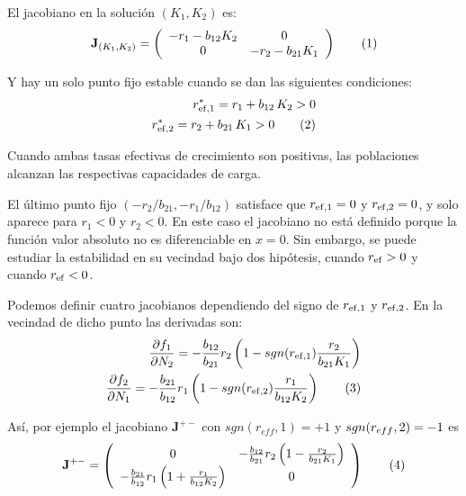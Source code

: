 El jacobiano en la solución $(K_1,K_2)$ es: 
\begin{equation}
\mathbf{J}_{\left(K_1,K_2\right)}= \left(
  \begin{array}{cc}
    -r_1-b_{12}K_2 & 0\\
    0 & -r_2-b_{21}K_1
    \end{array} \right)
\stepcounter{equation}\tag{\theequation}\label{eq:JacobK1K2}
\end{equation}

Y hay un solo punto fijo estable cuando se dan las siguientes condiciones:
\begin{align*}
\displaystyle r^{\ast}_{\rm{ef},1} = r_{1} + b_{12}\, K_2 > 0 \\
\displaystyle r^{\ast}_{\rm{ef},2} = r_{2} + b_{21}\, K_1 > 0
\stepcounter{equation}\tag{\theequation}\label{eq:conditio2}
\end{align*}

Cuando ambas tasas efectivas de crecimiento son positivas, las poblaciones alcanzan las respectivas capacidades de carga.

El último punto fijo $({-r_{2}}/{b_{21}}, {-r_{1}}/{b_{12}})$ satisface que $r_{\rm{ef},1}=0$ y $r_{\rm{ef},2}=0$, y solo aparece para $r_{1}<0$ y $r_{2}<0$. En este caso el jacobiano no está definido porque la función valor absoluto no es diferenciable en $x=0$. Sin embargo, se puede estudiar la estabilidad en su vecindad bajo dos hipótesis, cuando $r_{\rm{ef}}>0$ y cuando $r_{\rm{ef}}<0$.

Podemos definir cuatro jacobianos dependiendo del signo de $r_{\rm{ef},1}$ y $r_{\rm{ef},2}$. En la vecindad de dicho punto las derivadas son:
\begin{align*}
\displaystyle \frac{\partial f_1}{\partial N_2} = -\frac{b_{12}}{b_{21}}r_2\left(1-sgn(r_{\rm{ef},1})\frac{r_2}{b_{21}K_1} \right)\\
\displaystyle \frac{\partial f_2}{\partial N_1} = -\frac{b_{21}}{b_{12}}r_1\left(1-sgn(r_{\rm{ef},2})\frac{r_1}{b_{12}K_2} \right)
\stepcounter{equation}\tag{\theequation}\label{eq:deriv_reff_0}
\end{align*}

Así, por ejemplo el jacobiano $\mathbf{J}^{+-}$ con $sgn(r_{eff},1)=+1$ y $sgn(r_{eff},\break2)=-1$ es
\begin{equation}
\mathbf{J}^{+-}= \left(
  \begin{array}{cc}
    0 & -\frac{b_{12}}{b_{21}}r_2\left(1-\frac{r_2}{b_{21}K_1} \right)\\
    -\frac{b_{21}}{b_{12}}r_1\left(1+\frac{r_1}{b_{12}K_2} \right)  & 0
    \end{array} \right)
\stepcounter{equation}\tag{\theequation}\label{eq:Jacob+-}
\vspace*{5mm}
\end{equation}

